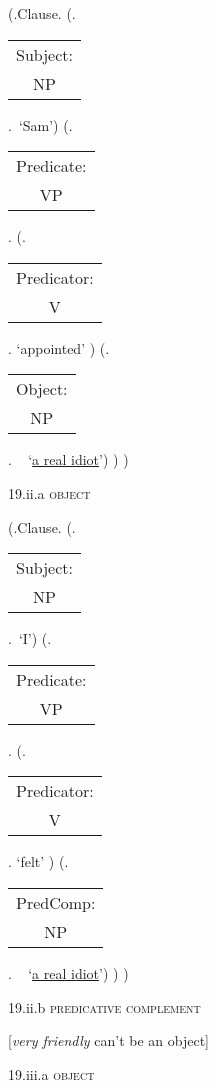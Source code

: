 \documentclass[12pt,letterpaper]{article}
\begin{document}
\begin{figure}
	\begin{center}
		\begin{parsetree}
			(.Clause.
			(.\begin{tabular}{c}Subject:\\NP\end{tabular}.~`Sam')
			(.\begin{tabular}{c}Predicate:\\VP\end{tabular}.
			(.\begin{tabular}{c}Predicator:\\V\end{tabular}. `appointed' )
			(.\begin{tabular}{c}Object:\\NP\end{tabular}.  ~ `\underline{a real idiot}')
			)
			)
			
			\hfill \break\hfill \break
		\end{parsetree}
		19.ii.a \textsc{object}
	\end{center}
\end{figure}

\begin{figure}
	\begin{center}
		\begin{parsetree}
			(.Clause.
			(.\begin{tabular}{c}Subject:\\NP\end{tabular}.~`I')
			(.\begin{tabular}{c}Predicate:\\VP\end{tabular}.
			(.\begin{tabular}{c}Predicator:\\V\end{tabular}. `felt' )
			(.\begin{tabular}{c}PredComp:\\NP\end{tabular}.  ~ `\underline{a real idiot}')
			)
			)
			
			\hfill \break\hfill \break
		\end{parsetree}
		19.ii.b \textsc{predicative complement}
	\end{center}
\end{figure}

\clearpage
\begin{figure}
	\begin{center}
		[\emph{very friendly} can't be an object]
		
		\hfill \break\hfill \break
		19.iii.a \textsc{object}
	\end{center}
\end{figure}
\end{document}
